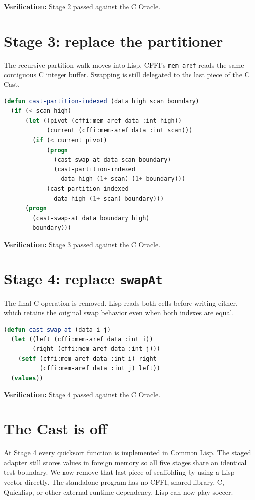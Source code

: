 \documentclass[fontsize=16pt]{scrartcl}
\begin{document}
\textbf{Verification:} Stage 2 passed against the C Oracle.

\section*{Stage 3: replace the partitioner}

The recursive partition walk moves into Lisp.  CFFI's \texttt{mem-aref} reads
the same contiguous C integer buffer.  Swapping is still delegated to the last
piece of the C Cast.

\begin{lstlisting}[language=Lisp]
(defun cast-partition-indexed (data high scan boundary)
  (if (< scan high)
      (let ((pivot (cffi:mem-aref data :int high))
            (current (cffi:mem-aref data :int scan)))
        (if (< current pivot)
            (progn
              (cast-swap-at data scan boundary)
              (cast-partition-indexed
                data high (1+ scan) (1+ boundary)))
            (cast-partition-indexed
              data high (1+ scan) boundary)))
      (progn
        (cast-swap-at data boundary high)
        boundary)))
\end{lstlisting}

\textbf{Verification:} Stage 3 passed against the C Oracle.

\section*{Stage 4: replace \texttt{swapAt}}

The final C operation is removed.  Lisp reads both cells before writing either,
which retains the original swap behavior even when both indexes are equal.

\begin{lstlisting}[language=Lisp]
(defun cast-swap-at (data i j)
  (let ((left (cffi:mem-aref data :int i))
        (right (cffi:mem-aref data :int j)))
    (setf (cffi:mem-aref data :int i) right
          (cffi:mem-aref data :int j) left))
  (values))
\end{lstlisting}

\textbf{Verification:} Stage 4 passed against the C Oracle.

\section*{The Cast is off}

At Stage 4 every quicksort function is implemented in Common Lisp.  The staged
adapter still stores values in foreign memory so all five stages share an
identical test boundary.  We now remove that last piece of scaffolding by using
a Lisp vector directly.  The standalone program has no CFFI, shared-library, C,
Quicklisp, or other external runtime dependency.  Lisp can now play soccer.
\end{document}
